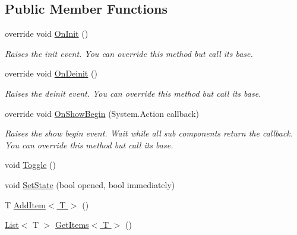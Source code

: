 \subsection*{Public Member Functions}
\begin{DoxyCompactItemize}
\item 
override void \hyperlink{class_unity_engine_1_1_u_i_1_1_windows_1_1_components_1_1_popup_component_adb7f8bbc410364dd63947a1e9c6ae220}{On\+Init} ()
\begin{DoxyCompactList}\small\item\em Raises the init event. You can override this method but call it\textquotesingle{}s base. \end{DoxyCompactList}\item 
override void \hyperlink{class_unity_engine_1_1_u_i_1_1_windows_1_1_components_1_1_popup_component_a20976ce235a7ac78fdff867d4249840a}{On\+Deinit} ()
\begin{DoxyCompactList}\small\item\em Raises the deinit event. You can override this method but call it\textquotesingle{}s base. \end{DoxyCompactList}\item 
override void \hyperlink{class_unity_engine_1_1_u_i_1_1_windows_1_1_components_1_1_popup_component_a04489b8cc465678d6140530c6e9a430e}{On\+Show\+Begin} (System.\+Action callback)
\begin{DoxyCompactList}\small\item\em Raises the show begin event. Wait while all sub components return the callback. You can override this method but call it\textquotesingle{}s base. \end{DoxyCompactList}\item 
void \hyperlink{class_unity_engine_1_1_u_i_1_1_windows_1_1_components_1_1_popup_component_a65c24abd3c2e03358502aa28839919cc}{Toggle} ()
\item 
void \hyperlink{class_unity_engine_1_1_u_i_1_1_windows_1_1_components_1_1_popup_component_ab740379e7a4a54221733e4ac30945074}{Set\+State} (bool opened, bool immediately)
\item 
T \hyperlink{class_unity_engine_1_1_u_i_1_1_windows_1_1_components_1_1_popup_component_ac5dce33d0bf68036a33a7fd12d1955cb}{Add\+Item$<$ T $>$} ()
\item 
\hyperlink{class_unity_engine_1_1_u_i_1_1_windows_1_1_components_1_1_list}{List}$<$ T $>$ \hyperlink{class_unity_engine_1_1_u_i_1_1_windows_1_1_components_1_1_popup_component_a125e523cfbfd66603ba5e2dd6c9b128c}{Get\+Items$<$ T $>$} ()

\end{DoxyCompactItemize}
